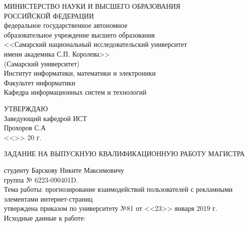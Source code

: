 \thispagestyle{empty}
\begin{center}
МИНИСТЕРСТВО НАУКИ И ВЫСШЕГО ОБРАЗОВАНИЯ \\
РОССИЙСКОЙ ФЕДЕРАЦИИ\vspace{14pt} \\
федеральное государственное автономное \\
образовательное учреждение высшего образования \\
<<Самарский национальный исследовательский университет \\
имени академика С.П. Королева>> \\
(Самарский университет)\vspace{14pt} \\
Институт информатики, математики и электроники \\
Факультет информатики \\
Кафедра информационных систем и технологий\vspace{28pt} \\
\end{center}
\begin{flushright}
    \onehalfspacing{}
    \begin{varwidth}{\linewidth}\centering
        УТВЕРЖДАЮ\\
        Заведующий кафедрой ИСТ\\
        \underline{\hspace{4cm}} Прохоров С.А\\
        <<\underline{\hspace{0.75cm}}>> \underline{\hspace{4.13cm}} 20\underline{\hspace{0.75cm}} г.
    \end{varwidth}
\end{flushright}\vspace{28pt}
\begin{center}
    ЗАДАНИЕ НА ВЫПУСКНУЮ КВАЛИФИКАЦИОННУЮ РАБОТУ МАГИСТРА
\end{center}\vspace{14pt}
\onehalfspacing{}
студенту Барскову Никите Максимовичу \\
группа № 6223-090401D. \\
Тема работы: прогнозирование взаимодействий пользователей с рекламными элементами интернет-страниц \\
утверждена приказом по университету №81 от <<23>> января 2019 г. \\
Исходные данные к работе: \\
